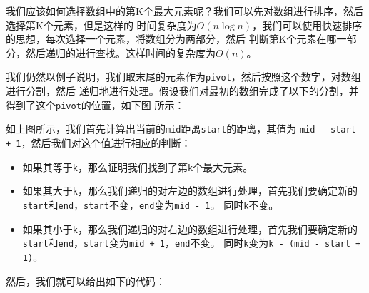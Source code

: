 \documentclass[../../main.tex]{subfiles}
\begin{document}
我们应该如何选择数组中的第K个最大元素呢？我们可以先对数组进行排序，然后选择第K个元素，但是这样的
时间复杂度为$O(n\log n)$，我们可以使用快速排序的思想，每次选择一个元素，将数组分为两部分，然后
判断第K个元素在哪一部分，然后递归的进行查找。这样时间的复杂度为$O(n)$。

我们仍然以例子说明，我们取末尾的元素作为\texttt{pivot}，然后按照这个数字，对数组进行分割，然后
递归地进行处理。假设我们对最初的数组完成了以下的分割，并得到了这个\texttt{pivot}的位置，如下图
所示：



如上图所示，我们首先计算出当前的\texttt{mid}距离\texttt{start}的距离，其值为
\texttt{mid - start + 1}，然后我们对这个值进行相应的判断：

\begin{itemize}
  \item 如果其等于\texttt{k}，那么证明我们找到了第\texttt{k}个最大元素。
  \item 如果其大于\texttt{k}，那么我们递归的对左边的数组进行处理，首先我们要确定新的
  \texttt{start}和\texttt{end}，\texttt{start}不变，\texttt{end}变为\texttt{mid - 1}。
  同时\texttt{k}不变。
  \item 如果其小于\texttt{k}，那么我们递归的对右边的数组进行处理，首先我们要确定新的
  \texttt{start}和\texttt{end}，\texttt{start}变为\texttt{mid + 1}，\texttt{end}不变。
  同时\texttt{k}变为\texttt{k - (mid - start + 1)}。
\end{itemize}

然后，我们就可以给出如下的代码：


\end{document}
